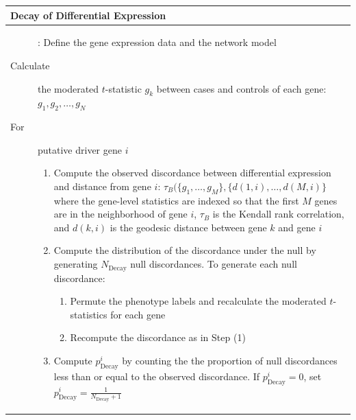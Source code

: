\documentclass[11pt]{article}
\begin{document}
\begin{table}[hb!]
\centering
  
\begin{tabular}{ p{\textwidth } }
  \hline
  
  \textbf{Decay of Differential Expression} \\
  \hline

 
  \begin{description}

    \item[\textbf{Input}]: Define the gene expression data and the network model

    \item [Calculate] the moderated $t$-statistic $g_k$ between cases and
          controls of each gene: $g_1, g_2,\dots,g_{N}$

    \item[For] putative driver gene $i$ 

    \begin{enumerate}

    	\item Compute the observed discordance between differential expression and distance from gene $i$: $\tau_{B}( \{g_1,\dots,g_M\}, \{d(1,i),\dots,d(M,i)\}$
      where the gene-level statistics are indexed so that the first $M$ genes are in the neighborhood of gene $i$, $\tau_B$ is the Kendall rank correlation,
      and $d(k,i)$ is the geodesic distance between gene $k$ and gene $i$


      \item Compute the distribution of the discordance under the null by
      generating $N_{\text{Decay}}$ null discordances. To
      generate each null discordance:

      \begin{enumerate}

          \item Permute the phenotype labels and recalculate the moderated
          $t$-statistics for each gene

          \item Recompute the discordance as in Step (1)

      \end{enumerate}


      \item Compute $p^i_{\text{Decay}}$ by counting the the proportion of 
            null discordances less than or equal to the observed discordance. 
            If $p^i_{\text{Decay}} = 0$, set 
            $p^i_{\text{Decay}}=\frac{1}{N_\text{Decay}+1}$


\end{enumerate}
\end{description}
\end{tabular}
\end{table}
\end{document}

